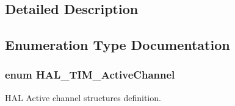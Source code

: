 \subsection{Detailed Description}


\subsection{Enumeration Type Documentation}
\hypertarget{group___t_i_m___exported___types_gaa3fa7bcbb4707f1151ccfc90a8cf9706}{
\subsubsection[{H\-A\-L\-\_\-\-T\-I\-M\-\_\-\-Active\-Channel}]{\setlength{\rightskip}{0pt plus 5cm}enum {\bf H\-A\-L\-\_\-\-T\-I\-M\-\_\-\-Active\-Channel}}}\label{group___t_i_m___exported___types_gaa3fa7bcbb4707f1151ccfc90a8cf9706}


H\-A\-L Active channel structures definition. 

